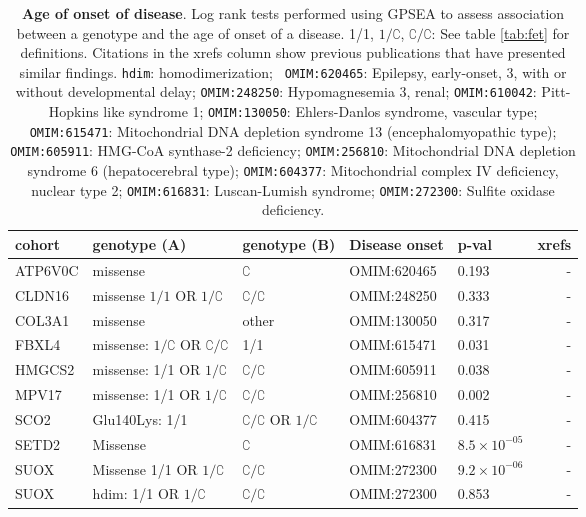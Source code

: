 \begin{table}
\centering
\begin{tabular}{l>{\raggedright\arraybackslash}p{4cm}p{2cm}>{\raggedright\arraybackslash}p{2.5cm}lr}
\toprule
\textbf{cohort} & \textbf{genotype (A)} & \textbf{genotype (B)} & \textbf{Disease onset} & \textbf{p-val} & \textbf{xrefs}\\
\midrule
ATP6V0C & missense & $\complement$ & OMIM:620465  & 0.193 & -\\
CLDN16 & missense $1/1$ OR  $1/\complement$ &  $\complement/\complement$ &OMIM:248250  & 0.333 & -\\
COL3A1 & missense & other &  OMIM:130050  & 0.317 & -\\
FBXL4 & missense:  $1/\complement$ OR  $\complement/\complement$ & 1/1 &  OMIM:615471  & 0.031 & -\\
HMGCS2 & missense: 1/1 OR $1/\complement$ & $\complement/\complement$ & OMIM:605911  & 0.038 & -\\
MPV17 & missense: 1/1 OR $1/\complement$  &$\complement/\complement$ & OMIM:256810  & 0.002 & -\\
SCO2 & Glu140Lys: 1/1 & $\complement/\complement$ OR  $1/\complement$ &  OMIM:604377  & 0.415 & -\\
SETD2 & Missense & $\complement$ & OMIM:616831  & $8.5 \times 10^{-05}$ & -\\
SUOX & Missense 1/1 OR $1/\complement$ & $\complement/\complement$ &OMIM:272300  & $9.2 \times 10^{-06}$ & -\\
SUOX & hdim: 1/1 OR $1/\complement$   & $\complement/\complement$  & OMIM:272300  & 0.853 & -\\
\bottomrule
\end{tabular}
\caption{\textbf{Age of onset of disease}. Log rank tests performed using GPSEA to assess association between a genotype and the age of onset of a disease. 1/1, $1/\complement$, $\complement/\complement$: See table \ref{tab:fet} for definitions. Citations in the xrefs column show previous publications that have presented similar findings. \texttt{hdim}: homodimerization;
   \texttt{ OMIM:620465}: Epilepsy, early-onset, 3, with or without developmental delay; 
   \texttt{OMIM:248250}: Hypomagnesemia 3, renal;
   \texttt{OMIM:610042}: Pitt-Hopkins like syndrome 1;
   \texttt{OMIM:130050}: Ehlers-Danlos syndrome, vascular type;
   \texttt{OMIM:615471}: Mitochondrial DNA depletion syndrome 13 (encephalomyopathic type);
   \texttt{OMIM:605911}:  HMG-CoA synthase-2 deficiency;
   \texttt{OMIM:256810}: Mitochondrial DNA depletion syndrome 6 (hepatocerebral type);
   \texttt{OMIM:604377}: Mitochondrial complex IV deficiency, nuclear type 2;
   \texttt{OMIM:616831}: Luscan-Lumish syndrome;
  \texttt{OMIM:272300}: Sulfite oxidase deficiency.
}
\label{tab:disease_onset}
\end{table}

